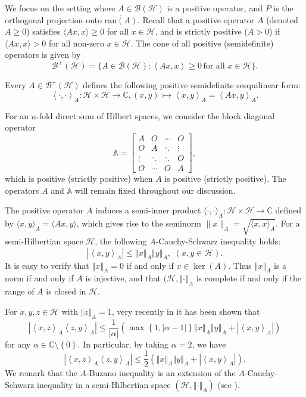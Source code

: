 \documentclass{article}
\newcommand{\bra}[1]{\left(#1\right)}
\newcommand{\seq}[1]{\left<#1\right>}
\newcommand{\seqA}[1]{{\left<#1\right>}_{A}}
\newcommand{\normA}[1]{{\left\Vert#1\right\Vert}_{A}}
\newcommand{\abs}[1]{\left\vert#1\right\vert}
\newcommand{\set}[1]{\left\{#1\right\}}
\renewcommand{\c}{\mathbb C}
\newcommand {\bh}{\mathcal{B}(\mathcal{H})}
\newcommand {\h}{\mathcal{H}}
\renewcommand {\b}{\mathcal{B}}
\begin{document}
We focus on the setting where $A \in \mathcal{B}(\mathcal{H})$ is a positive operator, and $P$ is the orthogonal projection onto $\overline{\mathrm{ran}(A)}$. Recall that a positive operator $A$ (denoted $A \geq 0$) satisfies $\langle Ax,x \rangle \geq 0$ for all $x \in \mathcal{H}$, and is strictly positive ($A > 0$) if $\langle Ax,x \rangle > 0$ for all non-zero $x \in \mathcal{H}$.
The cone of all positive (semidefinite) operators is given by
$$\b^+(\h)=\{A\in\bh:\seq{Ax,x}\geq 0\,\mbox{for all $x\in\h$}\}.$$

Every $A\in\b^+(\h)$ defines the following positive semidefinite sesquilinear form:
$$\seqA{\cdot,\cdot}:\h\times \h\to \c, (x,y)\rightarrowtail \seqA{x,y}=\seqA{Ax,y}.$$

For an $n$-fold direct sum of Hilbert spaces, we consider the block diagonal operator
\[
\mathbb{A} = \begin{bmatrix}
A & O & \cdots & O \\
O & A & \ddots & \vdots \\
\vdots & \ddots & \ddots & O \\
O & \cdots & O & A
\end{bmatrix},
\]
which is positive (strictly positive) when $A$ is positive (strictly positive). The operators $A$ and $\mathbb{A}$ will remain fixed throughout our discussion.

The positive operator $A$ induces a semi-inner product $\langle \cdot, \cdot \rangle_A : \mathcal{H} \times \mathcal{H} \to \mathbb{C}$ defined by $\langle x,y \rangle_A = \langle Ax,y \rangle$, which gives rise to the seminorm $\|x\|_A = \sqrt{\langle x,x \rangle_A}$.  For a semi-Hilbertian space $\h$, the following $A$-Cauchy-Schwarz inequality holds:
\begin{equation}\label{CS1}
  \abs{\seqA{x,y}}\leq \normA{x}\normA{y},\,\,\bra{x,y\in\h}.
\end{equation}
It is easy to verify that $\normA{x}=0$ if and only if $x\in\ker(A)$. Thus
$\normA{x}$ is a norm if and only if $A$ is injective, and that $(\h,\normA{\cdot}$ is complete if and only if
the range of $A$ is closed in $\h$.

For $x,y,z\in\h$ with $\normA{z}=1$,  very recently in \cite{KZ}
it has been shown that
\begin{equation}\label{Buz1}
  \abs{\seqA{x,z}\seqA{z,y}}\leq \frac{1}{\abs{\alpha}}\bra{\max\set{1,\abs{\alpha-1}}\normA{x}\normA{y}+\abs{\seqA{x,y}}}
\end{equation}
for any $\alpha\in\c\setminus\set{0}$. In particular, by taking $\alpha=2$, we have
\begin{equation}\label{Buz2}
  \abs{\seqA{x,z}\seqA{z,y}}\leq \frac{1}{2}\bra{\normA{x}\normA{y}+\abs{\seqA{x,y}}}.
\end{equation}
We remark that the $A$-Buzano inequality is an extension of the $A$-Cauchy-Schwarz inequality in a semi-Hilbertian space
$(\h,\normA{\cdot})$ (see \cite{KZ}).
\end{document}
